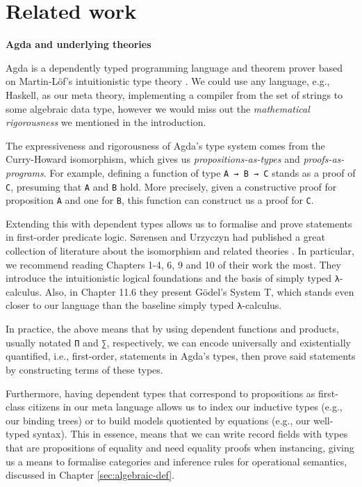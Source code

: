 \chapter{Related work}
\label{ch:relatedwork}

\noindent\textbf{Agda and underlying theories}

Agda \cite{agda} is a dependently typed programming language and theorem prover based on Martin-Löf's intuitionistic type theory \cite{martin1984intuitionistic}. We could use any language, e.g., Haskell, as our meta theory, implementing a compiler from the set of strings to some algebraic data type, however we would miss out the \textit{mathematical rigorousness} we mentioned in the introduction.

The expressiveness and rigorousness of Agda's type system comes from the Curry-Howard isomorphism, which gives us \textit{propositions-as-types} and \textit{proofs-as-programs}. For example, defining a function of type \verb$A → B → C$ stands as a proof of \verb$C$, presuming that \verb$A$ and \verb$B$ hold. More precisely, given a constructive proof for proposition \verb$A$ and one for \verb$B$, this function can construct us a proof for \verb$C$.

Extending this with dependent types allows us to formalise and prove statements in first-order predicate logic. S{\o}rensen and Urzyczyn had published a great collection of literature about the isomorphism and related theories \cite{sorensen1998curry}. In particular, we recommend reading Chapters 1-4, 6, 9 and 10 of their work the most. They introduce the intuitionistic logical foundations and the basis of simply typed \verb$λ$-calculus. Also, in Chapter 11.6 they present Gödel's System T, which stands even closer to our language than the baseline simply typed \verb$λ$-calculus.

In practice, the above means that by using dependent functions and products, usually notated \verb$Π$ and \verb$∑$, respectively, we can encode universally and existentially quantified, i.e., first-order, statements in Agda's types, then prove said statements by constructing terms of these types.

Furthermore, having dependent types that correspond to propositions as first-class citizens in our meta language allows us to index our inductive types (e.g., our binding trees) or to build models quotiented by equations (e.g., our well-typed syntax). This in essence, means that we can write record fields with types that are propositions of equality and need equality proofs when instancing, giving us a means to formalise categories and inference rules for operational semantics, discussed in Chapter \ref{sec:algebraic-def}.


